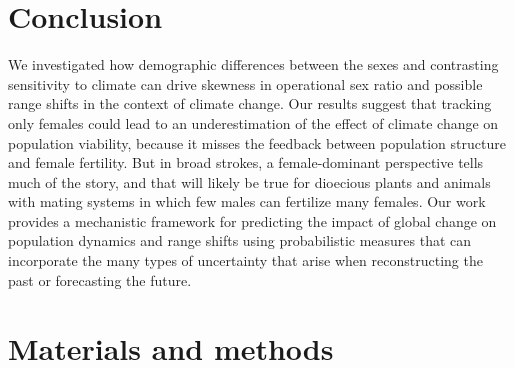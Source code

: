 \documentclass[9pt,twocolumn,twoside,lineno]{pnas-new}
\begin{document}
\section*{Conclusion}
We investigated how demographic differences between the sexes and contrasting sensitivity to climate can drive skewness in operational sex ratio and possible range shifts in the context of climate change. 
Our results suggest that tracking only females could lead to an underestimation of the effect of climate change on population viability, because it misses the feedback between population structure and female fertility. 
But in broad strokes, a female-dominant perspective tells much of the story, and that will likely be true for dioecious plants and animals with mating systems in which few males can fertilize many females.
Our work provides a mechanistic framework for predicting the impact of global change on population dynamics and range shifts using probabilistic measures that can incorporate the many types of uncertainty that arise when reconstructing the past or forecasting the future. 

\section*{Materials and methods}
\end{document}
